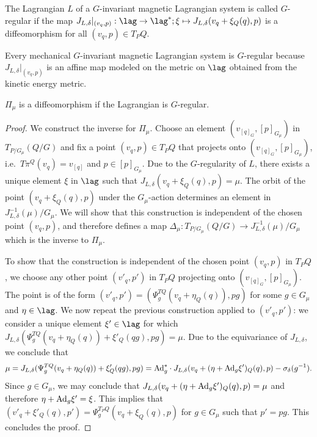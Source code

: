\begin{definition} The Lagrangian $L$ of a $G$-invariant magnetic Lagrangian system is called $G$-regular if the map $J_{L,\delta}|_{(v_q,p)}: \lag \to \lag^*; \xi \mapsto J_{L,\delta}(v_q +\xi_Q(q),p) $ is a dif\/feomorphism for all $(v_q,p)\in T_PQ$.
\end{definition}
Every mechanical $G$-invariant magnetic Lagrangian system is $G$-regular because $J_{L,\delta}|_{(v_q,p)}$ is an af\/f\/ine map modeled on the metric on $\lag$ obtained from the kinetic energy metric.

\begin{proposition}\label{prop:gregular} $\Pi_\mu$ is a diffeomorphism if the Lagrangian is $G$-regular.  \end{proposition}
\begin{proof}
We construct the inverse for $\Pi_\mu$. Choose an element $(v_{[q]_G},[p]_{G_\mu})$ in $T_{P/G_\mu}(Q/G)$ and f\/ix a point $(v_q,p)\in T_PQ$ that projects onto $(v_{[q]_G},[p]_{G_\mu})$, i.e.\ $T\pi^Q(v_q)=v_{[q]}$ and $p\in[p]_{G_\mu}$. Due to the $G$-regularity of $L$, there exists a unique element $\xi$ in $\lag$ such that $J_{L,\delta}(v_q +\xi_Q(q),p) = \mu$. The orbit of the point $(v_q+\xi_Q(q),p)$ under the $G_\mu$-action determines an element in $J_{L,\delta}^{-1}(\mu)/G_\mu$. We will show that this construction is independent of the chosen point $(v_q,p)$, and therefore def\/ines a map $\Delta_\mu: T_{P/G_\mu} (Q/G)\to J^{-1}_{L,\delta}(\mu)/G_\mu$ which is the inverse to $\Pi_\mu$.

To show that the construction is independent of the chosen point $(v_q,p)$ in $T_PQ$, we choose any other point $(v'_q,p')$ in $T_PQ$ projecting onto $(v_{[q]_G},[p]_{G_\mu})$. The point is of the form $(v'_q,p')=(\Psi^{TQ}_g(v_q+\eta_Q(q)),pg)$ for some $g\in G_\mu$ and $\eta\in\lag$. We now repeat the previous  construction applied to $(v'_q,p')$: we consider a unique element $\xi'\in\lag$ for which $J_{L,\delta}(\Psi^{TQ}_g(v_q+\eta_Q(q)) +\xi'_Q(qg),pg) = \mu$. Due to the equivariance of $J_{L,\delta}$, we conclude that
\begin{gather*}
\mu = J_{L,\delta}(\Psi^{TQ}_g(v_q+\eta_Q(q)) +\xi'_Q(qg),pg) ={\rm Ad}_g^*\cdot J_{L,\delta}(v_q+(\eta+{\rm Ad}_g\xi')_Q(q),p) -\sigma_\delta(g^{-1}).
 \end{gather*}
 Since $g\in G_\mu$, we may conclude that $J_{L,\delta}(v_q+(\eta+{\rm Ad}_g\xi')_Q(q),p)=\mu$ and therefore $\eta+{\rm Ad}_g\xi' = \xi$. This implies that $(v'_q+\xi'_Q(q),p')=\Psi^{T_PQ}_g(v_q+\xi_Q(q),p)$ for $g\in G_\mu$ such that $p'=pg$. This concludes the proof.
\end{proof}

